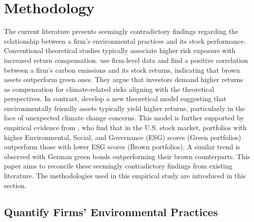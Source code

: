 \documentclass[12pt]{article}
\begin{document}
%
\section{Methodology} \label{sec:Methodology}
%
The current literature presents seemingly contradictory findings regarding the relationship between a firm's environmental practices and its stock performance. Conventional theoretical studies typically associate higher risk exposure with increased return compensation. \citet{bolton2021investors} use firm-level data and find a positive correlation between a firm's carbon emissions and its stock returns, indicating that brown assets outperform green ones. They argue that investors demand higher returns as compensation for climate-related risks aligning with the theoretical perspectives. In contrast, \cite{pastor2021sustainable} develop a new theoretical model suggesting that environmentally friendly assets typically yield higher returns, particularly in the face of unexpected climate change concerns. This model is further supported by empirical evidence from \cite{pastor2022dissecting}, who find that in the U.S. stock market, portfolios with higher Environmental, Social, and Governance (ESG) scores (Green portfolios) outperform those with lower ESG scores (Brown portfolios). A similar trend is observed with German green bonds outperforming their brown counterparts. This paper aims to reconcile these seemingly contradictory findings from existing literature. The methodologies used in this empirical study are introduced in this section.

\subsection{Quantify Firms' Environmental Practices}
\end{document}
